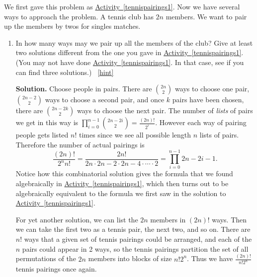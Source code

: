 \documentclass{book}
\begin{document}
\setcounter{project}{112}
\addtocounter{project}{-1}
\begin{activity}[]\label{tennispairings2}
\hypertarget{p-811}{}%
We first gave this problem as \hyperref[tennispairings1]{Activity~\ref{tennispairings1}}. Now we have several ways to approach the problem. A tennis club has \(2n\) members. We want to pair up the members by twos for singles matches.%
\begin{enumerate}[font=\bfseries,label=(\alph*),ref=\alph*]
\item\label{task-148} \hypertarget{p-812}{}%
In how many ways may we pair up all the members of the club? Give at least two solutions different from the one you gave in   \hyperref[tennispairings1]{Activity~\ref{tennispairings1}}. (You may not have done \hyperref[tennispairings1]{Activity~\ref{tennispairings1}}. In that case, see if you can find three solutions.)%
~\hfill{\tiny\hyperlink{a-112.a}{[hint]}\hypertarget{q-112.a}{}}\par\smallskip%
\noindent\textbf{Solution.}\hypertarget{solution-85}{}\quad%
\hypertarget{p-814}{}%
Choose people in pairs. There are \(\binom{2n}{2}\) ways to choose one pair, \(\binom{2n-2}{2}\) ways to choose a second pair, and once \(k\) pairs have been chosen, there are \(\binom{2n-2k}{2}\) ways to choose the next pair. The number of \emph{lists} of pairs we get in this way is \(\prod_{i=0}^{n-1} \binom{2n-2i}{2}= \frac{(2n)!}{2^i}\). However each way of pairing people gets listed \(n!\) times since we see all possible length \(n\) lists of pairs. Therefore the number of actual pairings is%
\begin{equation*}
\frac{(2n)!}{2^n n!} = \frac{2n!}{2n\cdot2n-2\cdot2n-4\cdot \cdots\cdot 2} =  \prod_{i=0}^{n-1} 2n-2i-1.
\end{equation*}
Notice how this combinatorial solution gives the formula that we found algebraically in \hyperref[tennispairings1]{Activity~\ref{tennispairings1}}, which then turns out to be algebraically equivalent to the formula we first saw in the solution to \hyperref[tennispairings1]{Activity~\ref{tennispairings1}}.%
\par
\hypertarget{p-815}{}%
For yet another solution, we can list the \(2n\) members in \((2n)!\) ways. Then we can take the first two as a tennis pair, the next two, and so on. There are \(n!\) ways that a given set of tennis pairings could be arranged, and each of the \(n\) pairs could appear in 2 ways, so the tennis pairings partition the set of all permutations of the \(2n\) members into blocks of size \(n!2^n\). Thus we have \(\frac{(2n)!}{n!2^n}\) tennis pairings once again.%

\end{enumerate}
\end{activity}
\end{document}
